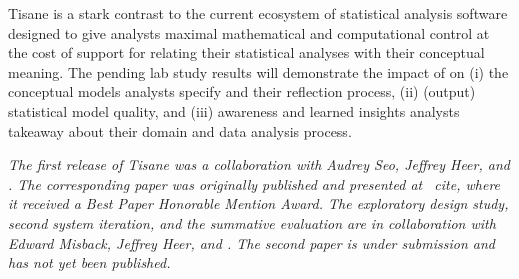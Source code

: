 Tisane is a stark contrast to the current ecosystem of statistical analysis
software designed to give analysts maximal mathematical and computational
control at the cost of support for relating their statistical analyses with
their conceptual meaning. The pending lab study results will demonstrate the
impact of \rTisane on (i) the conceptual models analysts specify and their
reflection process, (ii) (output) statistical model quality, and (iii) awareness
and learned insights analysts takeaway about their domain and data analysis
process. 



\textit{The first release of Tisane was a collaboration with Audrey Seo, Jeffrey
Heer, and \reneJust. The corresponding paper was originally published and presented at
~cite{}, where it received a \textit{Best Paper Honorable
Mention Award}. The exploratory design study, second system iteration, and the
summative evaluation are in collaboration with Edward Misback, Jeffrey Heer, and
\reneJust. The second paper is under submission and has not yet been published.}
